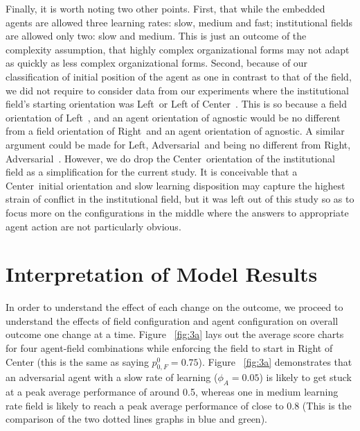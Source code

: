 \documentclass[12pt,letterpaper]{article}
\begin{document}
Finally, it is worth noting two other points. First, that while the embedded agents are allowed three learning rates: slow, medium and fast; institutional fields are allowed only two: slow and medium. This is just an outcome of the complexity assumption,  that highly complex organizational forms may not adapt as quickly as less complex organizational forms. Second, because of our classification of initial position of the agent as one in contrast to that of the field, we did not require to consider data from our experiments where the institutional field's starting orientation was \textquotesingle Left\textquotesingle \ or \textquotesingle Left of Center\textquotesingle \ . This is so because a field orientation of \textquotesingle Left\textquotesingle \ , and an agent orientation of agnostic would be no different from a field orientation of \textquotesingle Right\textquotesingle \ and an agent orientation of agnostic. A similar argument could be made for \textquotesingle Left, Adversarial\textquotesingle \ and being no different from \textquotesingle Right, Adversarial\textquotesingle \ . However, we do drop the \textquotesingle Center\textquotesingle \ orientation of the institutional field as a simplification for the current study. It is conceivable that a \textquotesingle Center\textquotesingle \ initial orientation and slow learning disposition may capture the highest strain of conflict in the institutional field, but it was left out of this study so as to focus more on the configurations in the middle where the answers to appropriate agent action are not particularly obvious.

\section{Interpretation of Model Results}
In order to understand the effect of each change on the outcome, we proceed to understand the effects of field configuration and agent configuration on overall outcome one change at a time. Figure ~\ref{fig:3a} lays out the average score charts for four agent-field combinations while enforcing the field to start in Right of Center (this is the same as saying $p_{0,F}^0 = 0.75$). Figure ~\ref{fig:3a} demonstrates that an adversarial agent with a slow rate of learning ($\phi_A = 0.05$) is likely to get stuck at a peak average performance of around 0.5, whereas one in medium learning rate field is likely to reach a peak average performance of close to 0.8 (This is the comparison of the two dotted lines graphs in blue and green). 
\end{document}
